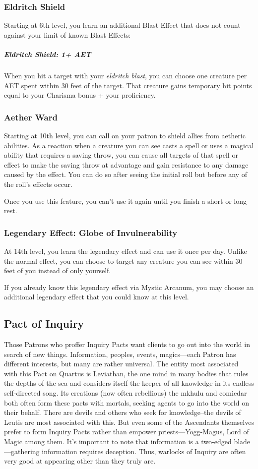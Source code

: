 \subsubsection{Eldritch Shield}
Starting at 6th level, you learn an additional Blast Effect that does not count against your limit of known Blast Effects:

\subparagraph*{Eldritch Shield: 1+ AET} When you hit a target with your \textit{eldritch blast}, you can choose one creature per AET spent within 30 feet of the target. That creature gains temporary hit points equal to your Charisma bonus + your proficiency.

\subsubsection{Aether Ward}
Starting at 10th level, you can call on your patron to shield allies from aetheric abilities. As a reaction when a creature you can see casts a spell or uses a magical ability that requires a saving throw, you can cause all targets of that spell or effect to make the saving throw at advantage and gain resistance to any damage caused by the effect. You can do so after seeing the initial roll but before any of the roll's effects occur.

Once you use this feature, you can't use it again until you finish a short or long rest.

\subsubsection{Legendary Effect: Globe of Invulnerability}
At 14th level, you learn the legendary effect  and can use it once per day. Unlike the normal effect, you can choose to target any creature you can see within 30 feet of you instead of only yourself.

If you already know this legendary effect via Mystic Arcanum, you may choose an additional legendary effect that you could know at this level.

\subsection{Pact of Inquiry}
Those Patrons who proffer Inquiry Pacts want clients to go out into the world in search of new things. Information, peoples, events, magics---each Patron has different interests, but many are rather universal. The entity most associated with this Pact on Quartus is Leviathan, the one mind in many bodies that rules the depths of the sea and considers itself the keeper of all knowledge in its endless self-directed song. Its creations (now often rebellious) the mkhulu and comiedar both often form these pacts with mortals, seeking agents to go into the world on their behalf. There are devils and others who seek for knowledge--the devils of Leutis are most associated with this. But even some of the Ascendants themselves prefer to form Inquiry Pacts rather than empower priests---Yogg-Magus, Lord of Magic among them. It's important to note that information is a two-edged blade---gathering information requires deception. Thus, warlocks of Inquiry are often very good at appearing other than they truly are.

